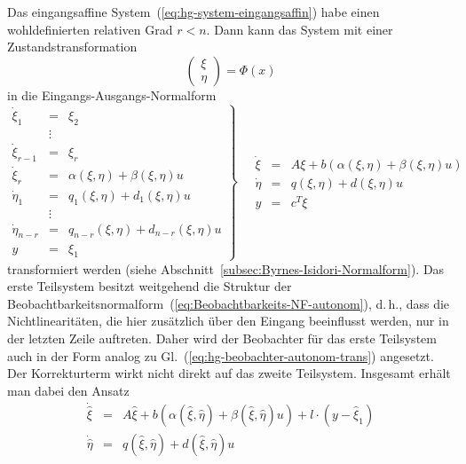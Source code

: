 Das eingangsaffine System~(\ref{eq:hg-system-eingangsaffin}) habe
einen wohldefinierten relativen Grad $r<n$. Dann kann das System
mit einer Zustandstransformation 
\begin{equation}
\left(\begin{array}{c}
\xi\\
\eta
\end{array}\right)=\Phi(x)\label{eq:hg-EA-Phi}
\end{equation}
 in die Eingangs-Ausgangs-Normalform
\begin{equation}
\left.\begin{array}{lcl}
\dot{\xi}_{1} & = & \xi_{2}\\
 & \vdots\\
\dot{\xi}_{r-1} & = & \xi_{r}\\
\dot{\xi}_{r} & = & \alpha(\xi,\eta)+\beta(\xi,\eta)u\\
\dot{\eta}_{1} & = & q_{1}(\xi,\eta)+d_{1}(\xi,\eta)u\\
 & \vdots\\
\dot{\eta}_{n-r} & = & q_{n-r}(\xi,\eta)+d_{n-r}(\xi,\eta)u\\
y & = & \xi_{1}
\end{array}\right\} \quad\begin{array}{rcl}
\dot{\xi} & = & A\xi+b(\alpha(\xi,\eta)+\beta(\xi,\eta)u)\\
\dot{\eta} & = & q(\xi,\eta)+d(\xi,\eta)u\\
y & = & c^{T}\xi
\end{array}\label{eq:hg-EA-NF}
\end{equation}
transformiert werden (siehe Abschnitt~\ref{subsec:Byrnes-Isidori-Normalform}).
Das erste Teilsystem besitzt weitgehend die Struktur der Beobachtbarkeitsnormalform~(\ref{eq:Beobachtbarkeits-NF-autonom}),
d.\,h., dass die Nichtlinearitäten, die hier zusätzlich über den
Eingang beeinflusst werden, nur in der letzten Zeile auftreten. Daher
wird der Beobachter für das erste Teilsystem auch in der Form analog
zu Gl.~(\ref{eq:hg-beobachter-autonom-trans}) angesetzt. Der Korrekturterm
wirkt nicht direkt auf das zweite Teilsystem. Insgesamt erhält man
dabei den Ansatz 
\begin{equation}
\begin{array}{rcl}
\dot{\hat{\xi}} & = & A\hat{\xi}+b(\alpha(\hat{\xi},\hat{\eta})+\beta(\hat{\xi},\hat{\eta})u)+l\cdot(y-\hat{\xi}_{1})\\
\dot{\hat{\eta}} & = & q(\hat{\xi},\hat{\eta})+d(\hat{\xi},\hat{\eta})u
\end{array}\label{eq:hg-EA-NF-Beobachter}
\end{equation}
